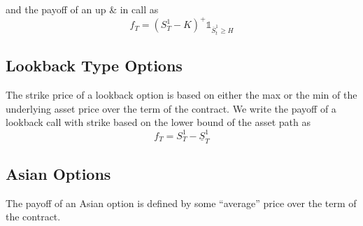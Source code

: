 \documentclass[12pt]{article}
\newlength\tindent
\renewcommand{\indent}{\hspace*{\tindent}}
\begin{document}
and the payoff of an up \& in call as
\begin{equation*}
	f_T = (S^1_T - K)^+\mathds 1_{\overline{S}^1_t\geq H}
\end{equation*}

\subsection{Lookback Type Options}

The strike price of a lookback option is based on either the max or the min of the underlying asset price over the term of the contract. We write the payoff of a lookback call with strike based on the lower bound of the asset path as
\begin{equation*}
	f_T = S^1_T - \underline{S}^1_T
\end{equation*}


\subsection{Asian Options}

\indent The payoff of an Asian option is defined by some ``average'' price over the term of the contract.
\end{document}
